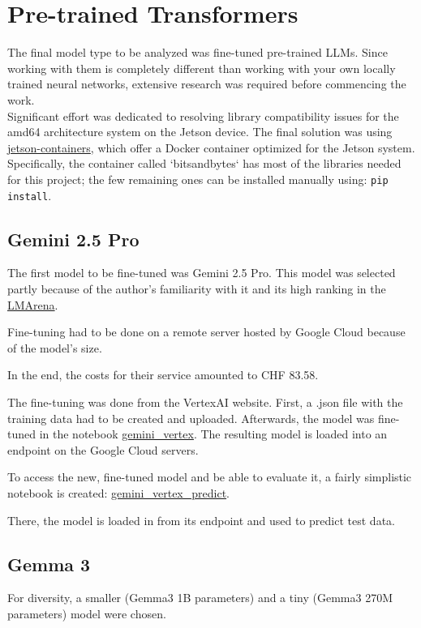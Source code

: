 \documentclass{article}
\begin{document}
\section{Pre-trained Transformers}

The final model type to be analyzed was fine-tuned pre-trained LLMs. Since working with them is completely different than working with your own locally trained neural networks, extensive research was required before commencing the work.
\\[1em]
Significant effort was dedicated to resolving library compatibility issues for the amd64 architecture system on the Jetson device. The final solution was using \href{https://github.com/dusty-nv/jetson-containers}{jetson-containers}, which offer a Docker container optimized for the Jetson system. Specifically, the container called `bitsandbytes` has most of the libraries needed for this project; the few remaining ones can be installed manually using: \texttt{pip install}.


\subsection{Gemini 2.5 Pro}
The first model to be fine-tuned was Gemini 2.5 Pro. This model was selected partly because of the author's familiarity with it and its high ranking in the \href{https://lmarena.ai/leaderboard}{LMArena}.

Fine-tuning had to be done on a remote server hosted by Google Cloud because of the model's size.

In the end, the costs for their service amounted to CHF 83.58.

The fine-tuning was done from the VertexAI website. First, a .json file with the training data had to be created and uploaded. Afterwards, the model was fine-tuned in the notebook \href{https://github.com/AntonStantan/matura/blob/main/pre-trained-tranformers/gemini_vertex.ipynb}{gemini\_vertex}. The resulting model is loaded into an endpoint on the Google Cloud servers.

To access the new, fine-tuned model and be able to evaluate it, a fairly simplistic notebook is created: \href{https://github.com/AntonStantan/matura/blob/main/pre-trained-tranformers/gemini_vertex_predict.ipynb}{gemini\_vertex\_predict}.

There, the model is loaded in from its endpoint and used to predict test data.

\subsection{Gemma 3}
For diversity, a smaller (Gemma3 1B parameters) and a tiny (Gemma3 270M parameters) model were chosen.
\end{document}
